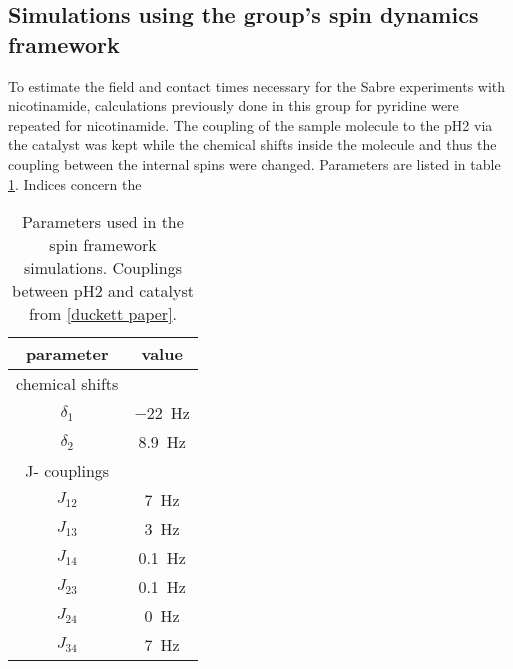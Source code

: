    \subsection{Simulations using the group's spin dynamics framework}
To estimate the field and contact times necessary for the Sabre experiments with nicotinamide, calculations previously done in this group for pyridine \cite{knecht_spin_2014} were repeated for nicotinamide. The coupling of the sample molecule to the pH2 via the catalyst was kept \cite{green_theory_2012-1} while the chemical shifts inside the molecule and thus the coupling between the internal spins were changed. Parameters are listed in table \ref{table:simulations:spinFrameworkParameters}. Indices concern the 
        \begin{table}
        \centering
            \begin{tabular}{|c|c|}
                \hline
                parameter & value\\
                \hline
                chemical shifts & \\
                \hline
                $\delta_1$ & \SI{-22}{\hertz}\\
                $\delta_2$ & \SI{8.9}{\hertz}\\
                \hline
                J- couplings & \\
                \hline
                $J_{12}$ & \SI{7}{\hertz}\\
                $J_{13}$ & \SI{3}{\hertz}\\
                $J_{14}$ & \SI{0.1}{\hertz}\\
                $J_{23}$ & \SI{0.1}{\hertz}\\
                $J_{24}$ & \SI{0}{\hertz}\\
                $J_{34}$ & \SI{7}{\hertz}\\
                \hline
            \end{tabular}
            \caption[Spin framework parameters]{Parameters used in the spin framework simulations. Couplings between pH2 and catalyst from \ref{duckett paper}. }
            \label{table:simulations:spinFrameworkParameters}
        \end{table}
